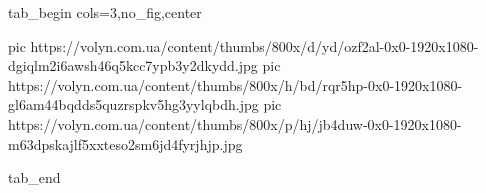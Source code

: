  
 
 
 
 

\ifcmt
  tab_begin cols=3,no_fig,center

     pic https://volyn.com.ua/content/thumbs/800x/d/yd/ozf2al-0x0-1920x1080-dgiqlm2i6awsh46q5kcc7ypb3y2dkydd.jpg
		 pic https://volyn.com.ua/content/thumbs/800x/h/bd/rqr5hp-0x0-1920x1080-gl6am44bqdds5quzrspkv5hg3yylqbdh.jpg
		 pic https://volyn.com.ua/content/thumbs/800x/p/hj/jb4duw-0x0-1920x1080-m63dpskajlf5xxteso2sm6jd4fyrjhjp.jpg

  tab_end
\fi
